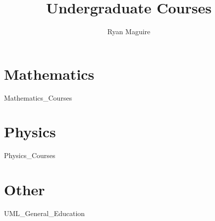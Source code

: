 \documentclass[crop=false,class=book,oneside]{standalone}
\begin{document}
    \newif\ifcourses
    \ifstandalone
        \title{Undergraduate Courses}
        \author{Ryan Maguire}
        \date{\vspace{-5ex}}
        \maketitle
        \tableofcontents
        \listoffigures
        \listoftables
        \clearpage
    \fi
    \part{Mathematics}
        {Mathematics_Courses}
    \part{Physics}
        {Physics_Courses}
    \part{Other}
        {UML_General_Education}
\end{document}
